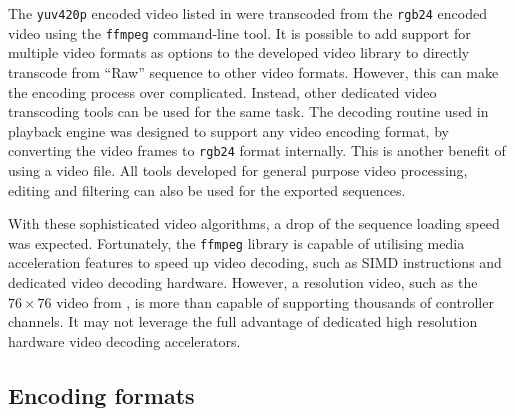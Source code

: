 The \texttt{yuv420p} encoded video listed in  were transcoded from the \texttt{rgb24} encoded video using the \texttt{ffmpeg} command-line tool. It is possible to add support for multiple video formats as options to the developed video library to directly transcode from ``Raw'' sequence to other video formats. However, this can make the encoding process over complicated. Instead, other dedicated video transcoding tools can be used for the same task. The decoding routine used in playback engine was designed to support any video encoding format, by converting the video frames to \texttt{rgb24} format internally. This is another benefit of using a video file. All tools developed for general purpose video processing, editing and filtering can also be used for the exported sequences.

With these sophisticated video  algorithms, a drop of the sequence loading speed was expected. Fortunately, the \texttt{ffmpeg} library is capable of utilising media acceleration features to speed up video decoding, such as SIMD instructions and dedicated video decoding hardware. However, a  resolution video, such as the $76 \times 76$ video from , is more than capable of supporting thousands of controller channels. It may not leverage the full advantage of dedicated high resolution hardware video decoding accelerators.

\subsection{Encoding formats}

